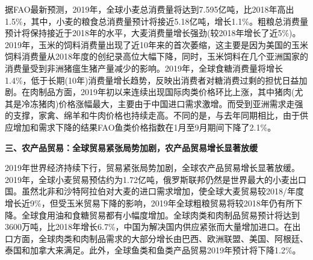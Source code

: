 \documentclass{progbookcn}
\begin{document}
据FAO最新预测，2019年，全球小麦总消费量将达到7.595亿吨，比2018年高出1.5\%，其中，小麦的粮食总消费量预计将接近5.18亿吨，增长1.1\%。粗粮总消费量预计将保持接近于2018年的水平，大麦消费量增长强劲(较2018年增长了近5\%)。2019年，玉米的饲料消费量出现了近10年来的首次萎缩，这主要是因为美国的玉米饲料消费量从2018年度的创纪录高位大幅下降，同时，玉米饲料在几个亚洲国家的消费量受到非洲猪瘟生猪产量减少的影响。2019年，全球食糖消费量将增长1.4\%，低于长期(10年)消费量增长趋势，反映出消费者对糖消费过剩的担忧日益加剧。在肉制品方面，2019年初以来连续出现国际肉类价格环比上涨，其中猪肉(尤其是冷冻猪肉)价格涨幅最大，主要由于中国进口需求激增。而受到亚洲需求走强的支撑，家禽、绵羊和牛肉价格也持续走高。不同的是，与去年同期相比，由于供应增加和需求下降的结果FAO鱼类价格指数在1月至9月期间下降了2.1\%。

\textbf{三、农产品贸易：全球贸易紧张局势加剧，农产品贸易增长显著放缓}

2019年世界经济持续下行，贸易紧张局势加剧，全球农产品贸易增长显著放缓。2019年，全球小麦贸易预估约为1.72亿吨，俄罗斯联邦仍然是世界最大的小麦出口国。虽然北非和沙特阿拉伯对大麦的进口需求增加，使全球大麦贸易较2018/年度增长近9\%，但受玉米贸易下降的影响，2019年全球粗粮贸易将较2018年仍有所下降。全球食用油和食糖贸易都有小幅度增加。全球肉类和肉制品贸易预计将达到3600万吨，比2018年增长6.7\%，中国为解决国内供应紧张而大量增加进口。在出口方面，全球肉类和肉制品需求的大部分增长由巴西、欧洲联盟、美国、阿根廷、泰国和加拿大来满足。此外，全球鱼类和鱼类产品贸易2019年预计将下降1.2\%。

\begin{table}[]
\centering
{}
\end{table}
\end{document}
